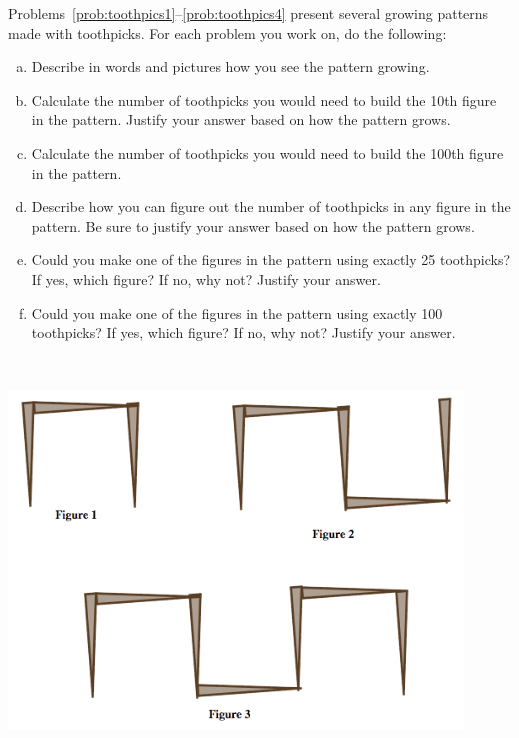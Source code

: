 Problems~\ref{prob:toothpics1}--\ref{prob:toothpics4} present several growing patterns made with toothpicks.  For each problem you work on, do the following:
\begin{enumerate}[(a)]
\item
Describe in words and pictures how you see the pattern growing.\\

\item
Calculate the number of toothpicks you would need to build the 10th figure in the pattern.  Justify your answer based on how the pattern grows.\\

\item
Calculate the number of toothpicks you would need to build the 100th figure in the pattern.  \\

\item
Describe how you can figure out the number of toothpicks in any figure in the pattern.  Be sure to justify your answer based on how the pattern grows.\\

\item
Could you make one of the figures in the pattern using exactly 25 toothpicks?  If yes, which figure?  If no, why not?  Justify your answer.\\

\item
Could you make one of the figures in the pattern using exactly 100 toothpicks?  If yes, which figure?  If no, why not?    Justify your answer.\\


\end{enumerate}

\bigskip

\begin{problem}\label{prob:toothpics1}\ 

\begin{center}
\includegraphics[height=9cm]{toothpicks1}
\end{center}

\end{problem}


